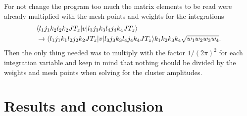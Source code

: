 For not change the program too much the matrix elements to be read were already multiplied with the mesh points and weights for the integrations
\begin{equation*}
		\begin{split}
             &\langle l_1j_1k_2l_2k_2JT_z|v|l_3j_3k_3l_4j_4k_4JT_z\rangle\\
             & \rightarrow \langle l_1j_1k_1l_2j_2k_2JT_z|v|l_3j_3k_3l_4j_4k_4JT_z\rangle k_1k_2k_3k_4\sqrt{w_1w_2w_3w_4}.
        \end{split}
\end{equation*}
Then the only thing needed was to multiply with the factor $1/(2\pi)^2$  for
each integration variable and keep in mind that nothing should be divided by
the weights and mesh points when solving for the cluster amplitudes. 

\clearpage


\section{Results and conclusion}

